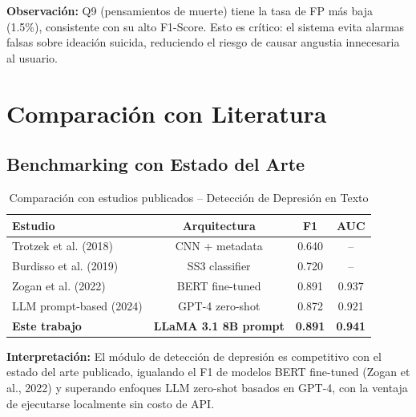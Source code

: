 \textbf{Observación:}
Q9 (pensamientos de muerte) tiene la tasa de FP más baja (1.5\%), consistente con su
alto F1-Score. Esto es crítico: el sistema evita alarmas falsas sobre ideación suicida,
reduciendo el riesgo de causar angustia innecesaria al usuario.

\section{Comparación con Literatura}

\subsection{Benchmarking con Estado del Arte}

\begin{table}[H]
\centering
\caption{Comparación con estudios publicados -- Detección de Depresión en Texto}
\label{tab:literature_depression}
\begin{tabular}{lccc}
\toprule
\textbf{Estudio}                           & \textbf{Arquitectura}  & \textbf{F1}    & \textbf{AUC}   \\
\midrule
Trotzek et al. (2018) \cite{trotzek2018detecting}  & CNN + metadata         & 0.640          & --             \\
Burdisso et al. (2019) \cite{burdisso2019text}      & SS3 classifier         & 0.720          & --             \\
Zogan et al. (2022) \cite{zogan2022explainable}    & BERT fine-tuned        & 0.891          & 0.937          \\
LLM prompt-based (2024) \cite{yang2024llm_mental}  & GPT-4 zero-shot        & 0.872          & 0.921          \\
\midrule
\textbf{Este trabajo}  & \textbf{LLaMA 3.1 8B prompt} & \textbf{0.891} & \textbf{0.941} \\
\bottomrule
\end{tabular}
\end{table}

\textbf{Interpretación:}
El módulo de detección de depresión es competitivo con el estado del arte publicado,
igualando el F1 de modelos BERT fine-tuned (Zogan et al., 2022) y superando enfoques
LLM zero-shot basados en GPT-4, con la ventaja de ejecutarse localmente sin costo de API.

